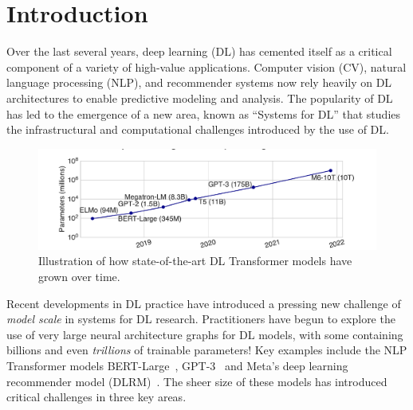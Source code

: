 \section{Introduction}
\label{sec:intro}
Over the last several years, deep learning (DL) has cemented itself as a critical component of a variety of high-value applications.
Computer vision (CV), natural language processing (NLP), and recommender systems now rely heavily on DL architectures to 
enable predictive modeling and analysis. The popularity of DL has led to the emergence of a new area, known as ``Systems for DL''
that studies the infrastructural and computational challenges introduced by the use of DL. 

\begin{figure}[th!]
\centering
	\includegraphics[keepaspectratio=true, width=\linewidth]{images/scaling_over_time}
	\caption{Illustration of how state-of-the-art DL Transformer models have grown over time.}
	\label{fig:scaling}
\end{figure}

Recent developments in DL practice have introduced a pressing new challenge of \textit{model scale} in systems for DL research. Practitioners
have begun to explore the use of very large neural architecture graphs for DL models, with some containing billions and 
even \textit{trillions} of trainable parameters! Key examples include the NLP Transformer models BERT-Large~\cite{bert2018}, GPT-3~\cite{gpt2020}
and Meta's deep learning recommender model (DLRM)~\cite{dlrm2019}. The sheer size of these models has introduced critical challenges in three key areas.

